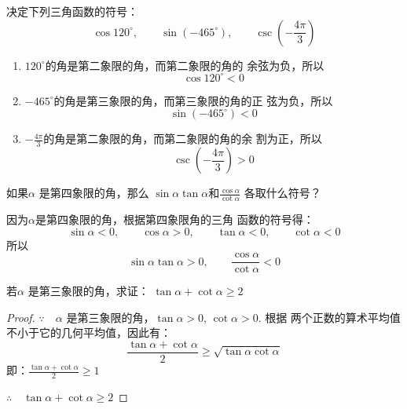 \begin{example}
    决定下列三角函数的符号：
\[\cos120^{\circ},\qquad \sin(-465^{\circ}),\qquad \csc\left(-\frac{4\pi}{3}\right)\]
\end{example}


\begin{solution}
\begin{enumerate}
    \item $120^{\circ}$的角是第二象限的角，而第二象限的角的
余弦为负，所以$$\cos120^{\circ}<0$$
\item $-465^{\circ}$的角是第三象限的角，而第三象限的角的正
弦为负，所以$$\sin(-465^{\circ})<0$$
\item $-\frac{4\pi}{3}$的角是第二象限的角，而第二象限的角的余
割为正，所以$$\csc\left(-\frac{4\pi}{3}\right)>0$$
\end{enumerate}    
\end{solution}



\begin{example}
    如果$\alpha$ 是第四象限的角，那么
$\sin\alpha \tan \alpha$和$\frac{\cos\alpha }{\cot \alpha}$
各取什么符号？
\end{example}

\begin{solution}
    因为$\alpha$是第四象限的角，根据第四象限角的三角
函数的符号得：
\[\sin\alpha <0,\qquad \cos\alpha>0,\qquad  \tan \alpha<0,\qquad \cot \alpha<0\]
所以
\[\sin\alpha \tan \alpha>0,\qquad  \frac{\cos\alpha}{\cot\alpha}<0\]
\end{solution}


\begin{example}
    若$\alpha$ 是第三象限的角，求证：
$\tan \alpha+\cot \alpha\ge 2$
\end{example}

\begin{proof}
    $\because\quad \alpha$ 是第三象限的角，$\tan \alpha>0$, $\cot \alpha>0$. 根据
两个正数的算术平均值不小于它的几何平均值，因此有：
\[\frac{\tan\alpha+\cot\alpha}{2}\ge \sqrt{\tan \alpha \cot \alpha}\]
即：$\frac{\tan\alpha+\cot\alpha}{2}\ge 1$

$\therefore\quad \tan\alpha+\cot\alpha\ge 2$
\end{proof}

